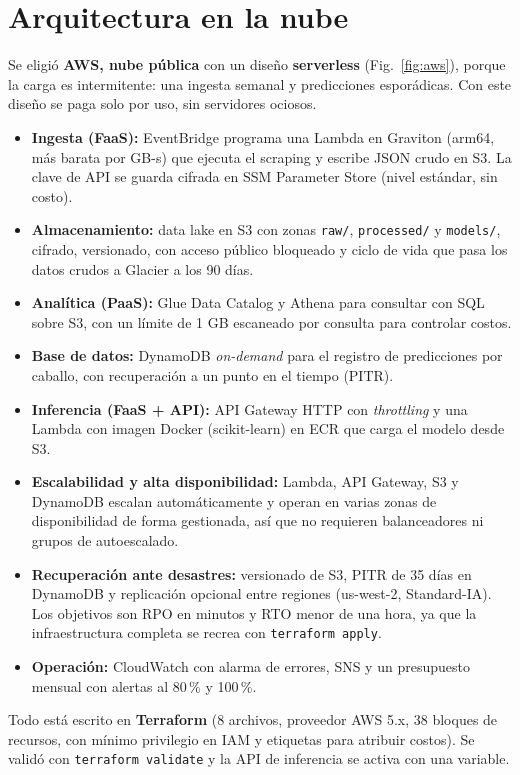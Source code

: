 \documentclass[conference,a4paper]{IEEEtran}
\begin{document}
\section{Arquitectura en la nube}
\label{sec:cloud}
Se eligió \textbf{AWS, nube pública} con un diseño \textbf{serverless} (Fig.~\ref{fig:aws}), porque la carga es intermitente: una ingesta semanal y predicciones esporádicas. Con este diseño se paga solo por uso, sin servidores ociosos.
\begin{itemize}
\item \textbf{Ingesta (FaaS):} EventBridge programa una Lambda en Graviton (arm64, más barata por GB-s) que ejecuta el scraping y escribe JSON crudo en S3. La clave de API se guarda cifrada en SSM Parameter Store (nivel estándar, sin costo).
\item \textbf{Almacenamiento:} data lake en S3 con zonas \texttt{raw/}, \texttt{processed/} y \texttt{models/}, cifrado, versionado, con acceso público bloqueado y ciclo de vida que pasa los datos crudos a Glacier a los 90 días.
\item \textbf{Analítica (PaaS):} Glue Data Catalog y Athena para consultar con SQL sobre S3, con un límite de 1 GB escaneado por consulta para controlar costos.
\item \textbf{Base de datos:} DynamoDB \emph{on-demand} para el registro de predicciones por caballo, con recuperación a un punto en el tiempo (PITR).
\item \textbf{Inferencia (FaaS + API):} API Gateway HTTP con \emph{throttling} y una Lambda con imagen Docker (scikit-learn) en ECR que carga el modelo desde S3.
\item \textbf{Escalabilidad y alta disponibilidad:} Lambda, API Gateway, S3 y DynamoDB escalan automáticamente y operan en varias zonas de disponibilidad de forma gestionada, así que no requieren balanceadores ni grupos de autoescalado.
\item \textbf{Recuperación ante desastres:} versionado de S3, PITR de 35 días en DynamoDB y replicación opcional entre regiones (us-west-2, Standard-IA). Los objetivos son RPO en minutos y RTO menor de una hora, ya que la infraestructura completa se recrea con \texttt{terraform apply}.
\item \textbf{Operación:} CloudWatch con alarma de errores, SNS y un presupuesto mensual con alertas al 80\,\% y 100\,\%.
\end{itemize}
Todo está escrito en \textbf{Terraform} (8 archivos, proveedor AWS 5.x, 38 bloques de recursos, con mínimo privilegio en IAM y etiquetas para atribuir costos). Se validó con \texttt{terraform validate} y la API de inferencia se activa con una variable.
\end{document}

